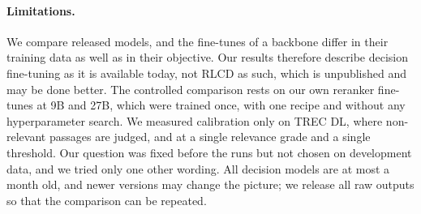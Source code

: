 \paragraph{Limitations.}
We compare released models, and the fine-tunes of a backbone differ in their training data as well as in their
objective. Our results therefore describe decision fine-tuning as it is available today, not RLCD as such, which is
unpublished and may be done better. The controlled comparison rests on our own reranker fine-tunes at 9B and 27B,
which were trained once, with one recipe and without any hyperparameter search. We measured calibration only on TREC
DL, where non-relevant passages are judged, and at a single relevance grade and a single threshold. Our question was
fixed before the runs but not chosen on development data, and we tried only one other wording. All decision models
are at most a month old, and newer versions may change the picture; we release all raw outputs so that the comparison
can be repeated.
